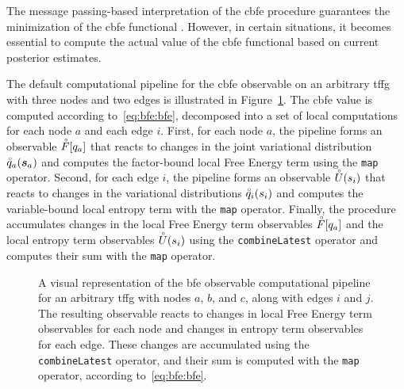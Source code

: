 The message passing-based interpretation of the \ac{cbfe} procedure guarantees the minimization of
the \ac{cbfe} functional \citep{senoz_thesis}.
However, in certain situations, it becomes essential to compute the actual value of the \ac{cbfe}
functional based on current posterior estimates.

The default computational pipeline for the \ac{cbfe} observable on an arbitrary \ac{tffg} with three nodes and two edges is illustrated in Figure~\ref{fig:rmp:reactive_bethe_free_energy}.
The \ac{cbfe} value is computed according to~\eqref{eq:bfe:bfe}, decomposed into a set of local
computations for each node $a$ and each edge $i$.
First, for each node $a$, the pipeline forms an observable $\accentset{\circ}{F}[q_a]$ that reacts
to changes in the joint variational distribution $\accentset{\circ}{q}_a(\bm{s}_a)$ and computes the
factor-bound local Free Energy term using the \texttt{map} operator.
Second, for each edge $i$, the pipeline forms an observable $\accentset{\circ}{U}(s_i)$ that reacts to
changes in the variational distributions $\accentset{\circ}{q}_i(s_i)$ and computes the variable-bound
local entropy term with the \texttt{map} operator.
Finally, the procedure accumulates changes in the local Free Energy term observables
$\accentset{\circ}{F}[q_a]$ and the local entropy term observables $\accentset{\circ}{U}(s_i)$ using the
\texttt{combineLatest} operator and computes their sum with the \texttt{map} operator.

\begin{figure}
  \centering
  \resizebox{\textwidth}{!}{}
  \caption{
    A visual representation of the \ac{bfe} observable computational pipeline for an arbitrary \ac{tffg} with nodes $a$, $b$, and $c$, along with edges $i$ and $j$.
    The resulting observable reacts to changes in local Free Energy term observables for each node
    and changes in entropy term observables for each edge.
    These changes are accumulated using the \texttt{combineLatest} operator, and their sum is
    computed with the \texttt{map} operator, according to~\eqref{eq:bfe:bfe}.
  }
  \label{fig:rmp:reactive_bethe_free_energy}
\end{figure}

